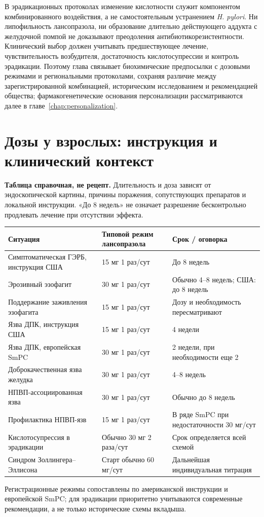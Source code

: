\documentclass[11pt,a4paper,notitlepage]{report}
\newcommand{\Hp}{\textit{H. pylori}}
\newcommand{\src}[1]{\unskip\space\cite{#1}}
\begin{document}
В эрадикационных протоколах изменение кислотности служит компонентом комбинированного воздействия, а не самостоятельным устранением \Hp. Ни липофильность лансопразола, ни образование длительно действующего аддукта с желудочной помпой не доказывают преодоления антибиотикорезистентности. Клинический выбор должен учитывать предшествующее лечение, чувствительность возбудителя, достаточность кислотосупрессии и контроль эрадикации. Поэтому глава связывает биохимические предпосылки с дозовыми режимами и региональными протоколами, сохраняя различие между зарегистрированной комбинацией, историческим исследованием и рекомендацией общества; фармакогенетические основания персонализации рассматриваются далее в главе~\ref{chap:personalization}.\src{acghp,maastricht,leonova2015,cpic}

\section{Дозы у взрослых: инструкция и клинический контекст}
\label{sec:doses}
\textbf{Таблица справочная, не рецепт.} Длительность и доза зависят от эндоскопической картины, причины поражения, сопутствующих препаратов и локальной инструкции. «До 8 недель» не означает разрешение бесконтрольно продлевать лечение при отсутствии эффекта.

\begin{longtable}{P{0.31\textwidth}P{0.29\textwidth}P{0.31\textwidth}}
\toprule
Ситуация & Типовой режим лансопразола & Срок / оговорка \\
\midrule
\endhead
Симптоматическая ГЭРБ, инструкция США & 15 мг 1 раз/сут & До 8 недель \\
Эрозивный эзофагит & 30 мг 1 раз/сут & Обычно 4--8 недель; США: до 8 недель \\
Поддержание заживления эзофагита & 15 мг 1 раз/сут & Дозу и необходимость пересматривают \\
Язва ДПК, инструкция США & 15 мг 1 раз/сут & 4 недели \\
Язва ДПК, европейская SmPC & 30 мг 1 раз/сут & 2 недели, при необходимости еще 2 \\
Доброкачественная язва желудка & 30 мг 1 раз/сут & 4--8 недель \\
НПВП-ассоциированная язва & 30 мг 1 раз/сут & Обычно до 8 недель \\
Профилактика НПВП-язв & 15 мг 1 раз/сут & В ряде SmPC при недостаточности 30 мг/сут \\
Кислотосупрессия в эрадикации & Обычно 30 мг 2 раза/сут & Срок определяется всей схемой \\
Синдром Золлингера--Эллисона & Старт обычно 60 мг/сут & Дальнейшая индивидуальная титрация \\
\bottomrule
\end{longtable}
Регистрационные режимы сопоставлены по американской инструкции и европейской SmPC; для эрадикации приоритетно учитываются современные рекомендации, а не только исторические схемы вкладыша.\src{uslabel,hpra,acghp}
\end{document}
